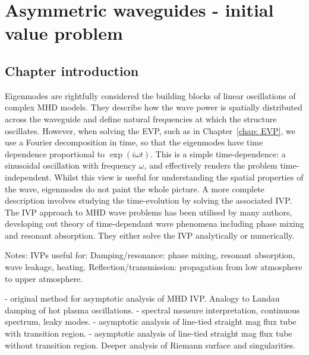 \documentclass[12pt]{../style-files/ociamthesis}
\begin{document}
\baselineskip=18pt

\setcounter{secnumdepth}{3}
\setcounter{tocdepth}{3}

\setcounter{chapter}{2}

\newcommand{\figdir}{../main/figures/chpt-3/} %

\newcommand{\bv}{\mathbf{v}}
\newcommand{\bB}{\mathbf{B}}

\chapter{Asymmetric waveguides - initial value problem}
\label{chap: IVP}

\section{Chapter introduction}
\label{sec: IVP intro}

Eigenmodes are rightfully considered the building blocks of linear oscillations of complex MHD models. They describe how the wave power is spatially distributed across the waveguide and define natural frequencies at which the structure oscillates. However, when solving the EVP, such as in Chapter~\ref{chap: EVP}, we use a Fourier decomposition in time, so that the eigenmodes have time dependence proportional to $\exp(i\omega t)$. This is a simple time-dependence: a sinusoidal oscillation with frequency $\omega$, and effectively renders the problem time-independent. Whilst this view is useful for understanding the spatial properties of the wave, eigenmodes do not paint the whole picture. A more complete description involves studying the time-evolution by solving the associated IVP. The IVP approach to MHD wave problems has been utilised by many authors, developing out theory of time-dependant wave phenomena including phase mixing and resonant absorption. They either solve the IVP analytically or numerically. 

\color{red}
Notes:
IVPs useful for:
Damping/resonance: phase mixing, resonant absorption, wave leakage, heating.
Reflection/transmission: propagation from low atmosphere to upper atmosphere.

\cite{sed71} - original method for asymptotic analysis of MHD IVP. Analogy to Landau damping of hot plasma oscillations.
\cite{and_etal07} - spectral measure interpretation, continuous spectrum, leaky modes.
\cite{rud_etal02} - asymptotic analysis of line-tied straight mag flux tube with transition region.
\cite{rud_etal06} - asymptotic analysis of line-tied straight mag flux tube without transition region. Deeper analysis of Riemann surface and singularities.
\end{document}
